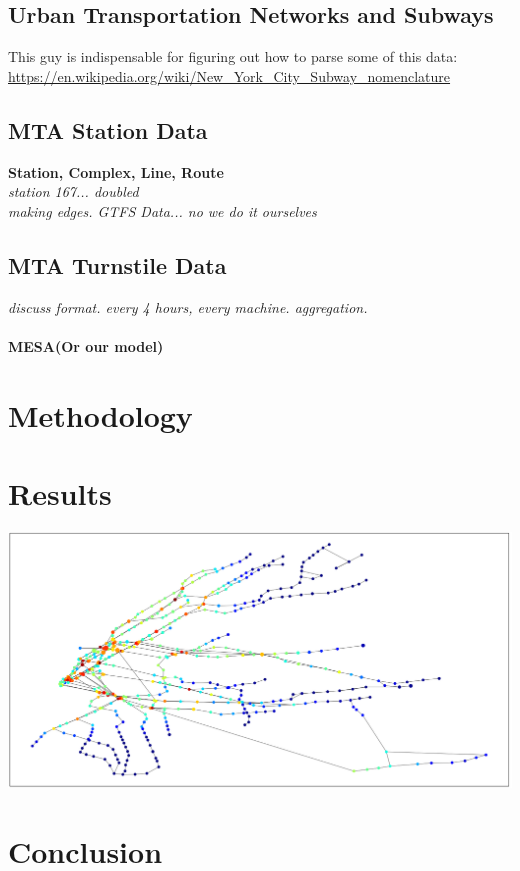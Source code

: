 \documentclass[12pt, a4, epsf] {article}
\theoremstyle{plain}
\theoremstyle{definition}
\begin{document}
\subsection*{Urban Transportation Networks and Subways}
This guy is indispensable for figuring out how to parse some of this data:\\
\url{https://en.wikipedia.org/wiki/New_York_City_Subway_nomenclature}
\subsection*{MTA Station Data}
\textbf{Station, Complex, Line, Route\\}
\textit{station 167... doubled\\}
\textit{making edges. GTFS Data... no we do it ourselves\\}
\subsection*{MTA Turnstile Data}
\textit{discuss format. every 4 hours, every machine. aggregation.\\}
\paragraph*{MESA(Or our model)}
\section*{Methodology}
\section*{Results}
\includegraphics[width = 1.0\textwidth]{Scratch_Visuals/Preliminary_Modeling.png}
\section*{Conclusion}
\nocite{*}
{}

\end{document}
